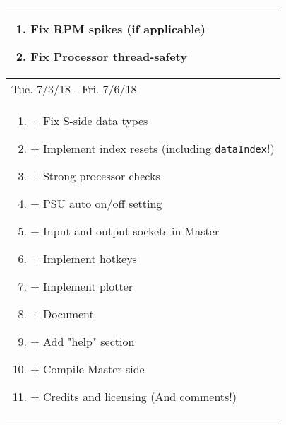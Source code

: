 \documentclass{article}
\begin{document}
\begin{center}
\begin{longtable}{| p{} |}
\begin{enumerate}
	\item \textbf{Fix RPM spikes (if applicable)}
	\item Fix Processor thread-safety
\end{enumerate}\\
\hline
\multicolumn{1}{|l|}{Tue. 7/3/18 - Fri. 7/6/18}\\*
\hline
\begin{enumerate}
	\item + Fix S-side data types
	\item + Implement index resets (including \texttt{dataIndex}!)
	\item + Strong processor checks
	\item + PSU auto on/off setting
	\item + Input and output sockets in Master
	\item + Implement hotkeys
	\item + Implement plotter
	\item + Document
	\item + Add "help" section
	\item + Compile Master-side
	\item + Credits and licensing (And comments!)
\end{enumerate}\\

\hline
\end{longtable}
\end{center}
\end{document}
